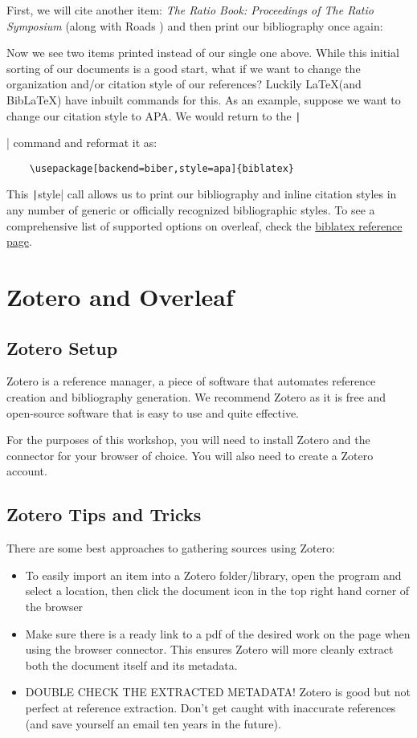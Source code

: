 \documentclass{article}
\begin{document}
First, we will cite another item: \textit{The Ratio Book: Proceedings of The Ratio Symposium} \cite{ratiobook} (along with Roads \cite{microsound}) and then print our bibliography once again:
\printbibliography[segment=2]

Now we see two items printed instead of our single one above. While this initial sorting of our documents is a good start, what if we want to change the organization and/or citation style of our references? Luckily \LaTeX (and BibLaTeX) have inbuilt commands for this.
As an example, suppose we want to change our citation style to APA. We would return to the \texttt|\usepackage[backend=biber]{biblatex}| command and reformat it as: 
\begin{verbatim}
    \usepackage[backend=biber,style=apa]{biblatex}
\end{verbatim}
This \texttt|style| call allows us to print our bibliography and inline citation styles in any number of generic or officially recognized bibliographic styles. To see a comprehensive list of supported options on overleaf, check the \href{https://www.overleaf.com/learn/latex/Biblatex_bibliography_styles}{biblatex reference page}.

\newrefsegment
\section{Zotero and Overleaf}
\subsection{Zotero Setup}
Zotero is a reference manager, a piece of software that automates reference creation and bibliography generation. We recommend Zotero as it is free and open-source software that is easy to use and quite effective.

For the purposes of this workshop, you will need to install Zotero and the connector for your browser of choice. You will also need to create a Zotero account.
\subsection{Zotero Tips and Tricks}
There are some best approaches to gathering sources using Zotero:
\begin{itemize}
    \item To easily import an item into a Zotero folder/library, open the program and select a location, then click the document icon in the top right hand corner of the browser
    \item Make sure there is a ready link to a pdf of the desired work on the page when using the browser connector. This ensures Zotero will more cleanly extract both the document itself and its metadata.
    \item DOUBLE CHECK THE EXTRACTED METADATA! Zotero is good but not perfect at reference extraction. Don't get caught with inaccurate references (and save yourself an email ten years in the future).
\end{itemize}
\end{document}
